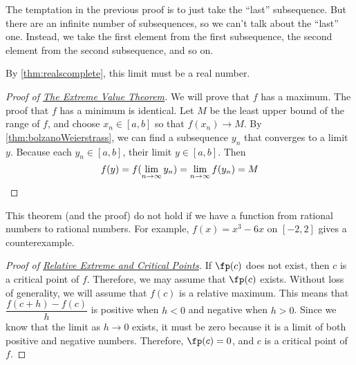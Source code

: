 The temptation in the previous proof is to just take the ``last'' subsequence.  But there are an infinite number of subsequences, so we can't talk about the ``last'' one.  Instead, we take the first element from the first subsequence, the second element from the second subsequence, and so on.

By \autoref{thm:realscomplete}, this limit must be a real number.

\begin{proof}[Proof of {\hyperref[thm:extremeVal]{The Extreme Value Theorem}}]
\label{pf:extremeVal}
We will prove that $f$ has a maximum.  The proof that $f$ has a minimum is identical.  Let $M$ be the least upper bound of the range of $f$, and choose $x_n\in[a,b]$ so that $f(x_n)\to M$.  By \autoref{thm:bolzanoWeierstrass}, we can find a subsequence $y_n$ that converges to a limit $y$.  Because each $y_n\in[a,b]$, their limit $y\in[a,b]$.  Then
\[
 f(y)=f(\lim_{n\to\infty}y_n)=\lim_{n\to\infty} f(y_n)=M
 \qedhere
\]
\end{proof}

This theorem (and the proof) do not hold if we have a function from rational numbers to rational numbers.  For example, $f(x)=x^3-6x$ on $[-2,2]$ gives a counterexample.

\begin{proof}[Proof of {\hyperref[thm:criticalpts]{Relative Extreme and Critical Points}}]\label{pf:criticalpts}
If $\fp(c)$ does not exist, then $c$ is a critical point of $f$.  Therefore, we may assume that $\fp(c)$ exists.  Without loss of generality, we will assume that $f(c)$ is a relative maximum.  This means that $\dfrac{f(c+h)-f(c)}h$ is positive when $h<0$ and negative when $h>0$.  Since we know that the limit as $h\to0$ exists, it must be zero because it is a limit of both positive and negative numbers.  Therefore, $\fp(c)=0$, and $c$ is a critical point of $f$.
\end{proof}

